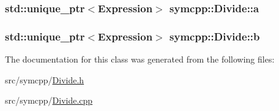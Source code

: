 \subsubsection[{\texorpdfstring{a}{a}}]{\setlength{\rightskip}{0pt plus 5cm}std\+::unique\+\_\+ptr$<${\bf Expression}$>$ symcpp\+::\+Divide\+::a\hspace{0.3cm}{\ttfamily [private]}}\hypertarget{classsymcpp_1_1Divide_a52eaf8a705da4ef10b1fa2b87e76d0d8}{}\label{classsymcpp_1_1Divide_a52eaf8a705da4ef10b1fa2b87e76d0d8}
\subsubsection[{\texorpdfstring{b}{b}}]{\setlength{\rightskip}{0pt plus 5cm}std\+::unique\+\_\+ptr$<${\bf Expression}$>$ symcpp\+::\+Divide\+::b\hspace{0.3cm}{\ttfamily [private]}}\hypertarget{classsymcpp_1_1Divide_a122c034c19635c036d39fbf18b1b8348}{}\label{classsymcpp_1_1Divide_a122c034c19635c036d39fbf18b1b8348}


The documentation for this class was generated from the following files\+:\begin{DoxyCompactItemize}
\item 
src/symcpp/\hyperlink{Divide_8h}{Divide.\+h}\item 
src/symcpp/\hyperlink{Divide_8cpp}{Divide.\+cpp}\end{DoxyCompactItemize}
